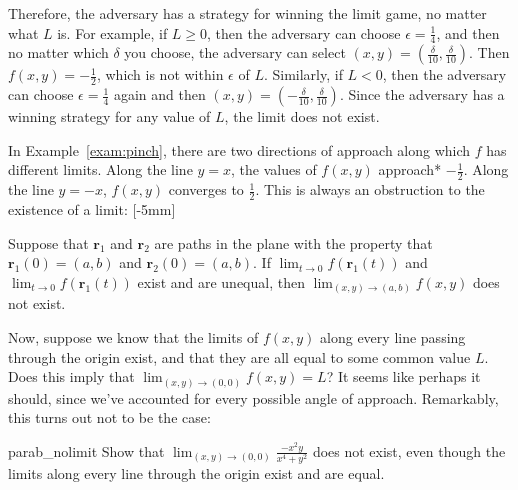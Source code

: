 \documentclass{watsonbook}
\begin{document}
\begin{solution}
  Therefore, the adversary has a strategy for winning the limit game,
  no matter what $L$ is. For example, if $L \geq 0$, then the
  adversary can choose $\epsilon = \tfrac{1}{4}$, and then no matter
  which $\delta$ you choose, the adversary can select
  $(x,y) = (\frac{\delta}{10}, \frac{\delta}{10})$. Then
  $f(x,y) = -\tfrac{1}{2}$, which is not within $\epsilon$ of
  $L$. Similarly, if $L < 0$, then the adversary can choose $\epsilon
  = \tfrac{1}{4}$ again and then $(x,y) = (-\frac{\delta}{10},
  \frac{\delta}{10})$. Since the adversary has a winning strategy for any value of
  $L$, the limit does not exist.
\end{solution}

In Example~\ref{exam:pinch}, there are two directions of approach
along which $f$ has different limits. Along the line $y = x$, the
values of $f(x,y)$ approach* $-\tfrac{1}{2}$. Along the line $y = -x$,
$f(x,y)$ converges to $\tfrac{1}{2}$. This is always an obstruction to
the existence of a limit: [-5mm]

\begin{exercise}{}{}
  Suppose that $\mathbf{r}_1$ and $\mathbf{r}_2$ are paths in the
  plane with the property that $\mathbf{r}_1(0) = (a,b)$ and
  $\mathbf{r}_2(0) = (a,b)$. If $\lim_{t \to 0}f(\mathbf{r}_1(t))$ and
  $\lim_{t \to 0}f(\mathbf{r}_1(t))$ exist and are unequal, then
  $\displaystyle{\lim_{(x,y) \to (a,b)} f(x,y)}$ does not exist. 
\end{exercise} \bang{-1.5cm}

Now, suppose we know that the limits of $f(x,y)$ along every line
passing through the origin exist, and that they are all equal to some
common value $L$. Does
this imply that $\lim_{(x,y) \to (0,0)}f(x,y) = L$? It seems like
perhaps it should, since we've accounted for every possible angle of
approach. Remarkably, this turns out not to be the case:

\begin{example}{}{parab_nolimit}
  Show that $\lim_{(x,y) \to (0,0)}\frac{-x^2 y }{x^4 + y^2}$ does not
  exist, even though the limits along every line through the origin
  exist and are equal. 
\end{example}
\end{document}
